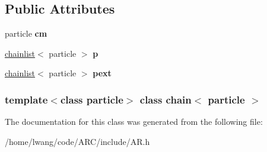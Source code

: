 \subsection*{Public Attributes}
\begin{DoxyCompactItemize}
\item 
\hypertarget{classchain_a84dfcd9f0112836152bc6843e8f74505}{
particle {\bfseries cm}}
\label{classchain_a84dfcd9f0112836152bc6843e8f74505}

\item 
\hypertarget{classchain_a1962dd942432d4f43b5f26e292fa4836}{
\hyperlink{classchainlist}{chainlist}$<$ particle $>$ {\bfseries p}}
\label{classchain_a1962dd942432d4f43b5f26e292fa4836}

\item 
\hypertarget{classchain_ad26d11d20934a500df042ecf333a3f72}{
\hyperlink{classchainlist}{chainlist}$<$ particle $>$ {\bfseries pext}}
\label{classchain_ad26d11d20934a500df042ecf333a3f72}

\end{DoxyCompactItemize}
\subsubsection*{template$<$class particle$>$ class chain$<$ particle $>$}



The documentation for this class was generated from the following file:\begin{DoxyCompactItemize}
\item 
/home/lwang/code/ARC/include/AR.h\end{DoxyCompactItemize}
